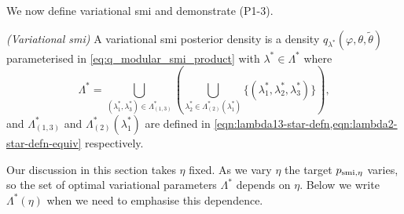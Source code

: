 We now define variational \acrshort*{smi} and demonstrate (P1-3).
\begin{definition}\label{defn:var-smi}
  \emph{(Variational \acrshort*{smi})}
  A variational \acrshort*{smi} posterior density is a density $q_{\lambda^*}(\varphi,\theta,\tilde\theta)$ parameterised in  \cref{eq:q_modular_smi_product} with $\lambda^*\in\Lambda^*$ where
  \begin{equation}\label{eqn:smi-lambda-star}
    \Lambda^*=\bigcup_{(\lambda^*_1,\lambda^*_3)\in \Lambda^*_{(1,3)}}\left(\bigcup_{\lambda^*_2\in\Lambda^*_{(2)}(\lambda^*_1)}\{(\lambda^*_1,\lambda^*_2,\lambda^*_3)\}\right),
  \end{equation}
  and $\Lambda^*_{(1,3)}$ and $\Lambda^*_{(2)}(\lambda^*_1)$ are defined in \cref{eqn:lambda13-star-defn,eqn:lambda2-star-defn-equiv} respectively.
\end{definition}


\begin{remark}\label{remk:smi-defn-eta-depend}
  Our discussion in this section takes $\eta$ fixed. As we vary $\eta$ the target $p_{\operatorname{\text{smi}},\eta}$ varies, so the set of optimal variational parameters $\Lambda^*$ depends on $\eta$. Below we write $\Lambda^*(\eta)$ when we need to emphasise this dependence.
\end{remark}

